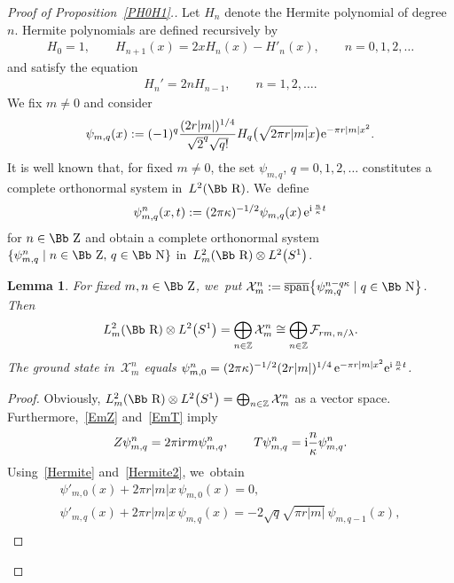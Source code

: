 \documentclass[10pt,a4paper]{amsart}
\newcommand\RR{{\mbox{\Bb R}}}
\newcommand\NN{{\mbox{\Bb N}}}
\newcommand\ZZ{{\mbox{\Bb Z}}}
\newcommand\Z{{\mathbb Z}}
\newcommand\cF{{\mathcal F}}
\newcommand{\cSpan}{{\overline{\rm span}}}
\numberwithin{equation}{section}
\newtheorem{Lemma}[Theorem]{Lemma}
\begin{document}
\begin{proof}[Proof of Proposition~\ref{PH0H1}.]
Let $H_n$ denote the Hermite polynomial of degree $n$. Hermite polynomials are defined recursively by
\begin{gather}\label{Hermite}
H_0=1,\qquad H_{n+1}(x)=2xH_n(x)-H'_{n}(x),\qquad n=0,1,2,\dots
\end{gather}
and satisfy the equation
\begin{gather}\label{Hermite2}
H_n'=2nH_{n-1},\qquad n=1,2,\dots.
\end{gather}
We fix $m\not= 0$ and consider
\begin{gather*}
\psi_{m,q}(x):=(-1)^q\frac{(2r|m|)^{1/4}}{\sqrt 2^q\sqrt{q!}}H_q\big(\sqrt{2\pi r|m|}x\big) {\rm e}^{-\pi r|m|x^2}.
\end{gather*}
It is well known that, for fixed $m\not=0$, the set $\psi_{m,q}$, $q=0,1,2,\dots$ constitutes a complete orthonormal system in~$L^2(\RR)$. We~define
\begin{gather*}
\psi_{m,q}^{n}(x,t):=(2\pi\kappa)^{-1/2} \psi_{m,q}(x)\, {\rm e}^{{\rm i}\,\frac{n}{\kappa}t}
\end{gather*}
for $n\in\ZZ$ and obtain a complete orthonormal system $\{\psi_{m,q}^{n}\mid n\in \ZZ,\, q\in\NN\}$ in~$L^2_{m}(\RR)\otimes L^2\big(S^1\big)$.
%
\begin{Lemma}\label{LL2m} For fixed $m,n\in\ZZ$, we~put ${\mathcal X}^{n}_m:=\cSpan\big\{\psi^{n-q\kappa}_{m,q}\mid q\in\NN\big\}$. Then
\begin{gather*}
L^2_m(\RR)\otimes L^2\big(S^1\big)=\bigoplus_{n\in\Z} {\mathcal X}_m^{n}\cong \bigoplus_{n\in\Z} \cF_{rm,\,n/\lambda}.
\end{gather*}
The ground state in~${\mathcal X}_m^{n}$ equals $\psi^n_{m,0}=(2\pi\kappa)^{-1/2}(2r|m|)^{1/4}\, {\rm e}^{-\pi r|m|x^2}{\rm e}^{{\rm i}\,\frac{n}{\kappa}t}$.
\end{Lemma}
\begin{proof}
{\sloppy
Obviously, $L^2_m(\RR)\otimes L^2\big(S^1\big)=\bigoplus_{n\in\Z} {\mathcal X}_m^{n}$ as a vector space. Furthermore,~\eqref{EmZ} and~\eqref{EmT} imply
\begin{gather*}
Z\psi_{m,q}^{n}=2\pi {\rm i}rm\psi_{m,q}^{n},\qquad
T\psi_{m,q}^{n}={\rm i}\frac{n}{\kappa}\psi_{m,q}^{n}. %
\end{gather*}}
Using~\eqref{Hermite} and~\eqref{Hermite2}, we~obtain
\begin{gather*}
\psi'_{m,0}(x)+2\pi r|m|x\,\psi_{m,0}(x)=0, %
\\
\psi'_{m,q}(x)+2\pi r|m|x\,\psi_{m,q}(x)=-2\sqrt{q}\sqrt{\pi r|m|}\,\psi_{m,q-1}(x),%
\\

\end{gather*}
\end{proof}
\end{proof}
\end{document}
